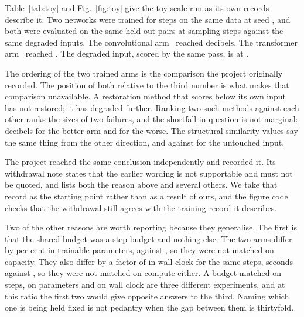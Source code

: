 Table~\ref{tab:toy} and Fig.~\ref{fig:toy} give the toy-scale run as its own
records describe it. Two networks were trained for \ToySteps{} steps on the same
data at seed \ToySeed{}, and both were evaluated on the same \ToyN{} held-out
pairs at \ToyEvalSteps{} sampling steps against the same degraded inputs. The
convolutional arm~\cite{ronneberger2015unet} reached \ToyConv{} decibels. The
transformer arm~\cite{peebles2023dit} reached \ToyTrans{}. The degraded input,
scored by the same pass, is at \ToyDegraded{}.

The ordering of the two trained arms is the comparison the project originally
recorded. The position of both relative to the third number is what makes that
comparison unavailable. A restoration method that scores below its own input has
not restored; it has degraded further. Ranking two such methods against each
other ranks the sizes of two failures, and the shortfall in question is not
marginal: \ToyConvShortfall{} decibels for the better arm and
\ToyTransShortfall{} for the worse. The structural similarity values say the same
thing from the other direction, \ToyConvSSIM{} and \ToyTransSSIM{} against
\ToyDegradedSSIM{} for the untouched input.

The project reached the same conclusion independently and recorded it. Its
withdrawal note states that the earlier wording is not supportable and must not
be quoted, and lists both the reason above and several others. We take that
record as the starting point rather than as a result of ours, and the figure code
checks that the withdrawal still agrees with the training record it describes.

Two of the other reasons are worth reporting because they generalise. The first
is that the shared budget was a step budget and nothing else. The two arms differ
by \ToyParamExcess{} per cent in trainable parameters, \ToyTransParams{} against
\ToyConvParams{}, so they were not matched on capacity. They also differ by a
factor of \ToySpeedRatio{} in wall clock for the same \ToySteps{} steps,
\ToyTransSeconds{} seconds against \ToyConvSeconds{}, so they were not matched on
compute either. A budget matched on steps, on parameters and on wall clock are
three different experiments, and at this ratio the first two would give opposite
answers to the third. Naming which one is being held fixed is not pedantry when
the gap between them is thirtyfold.

